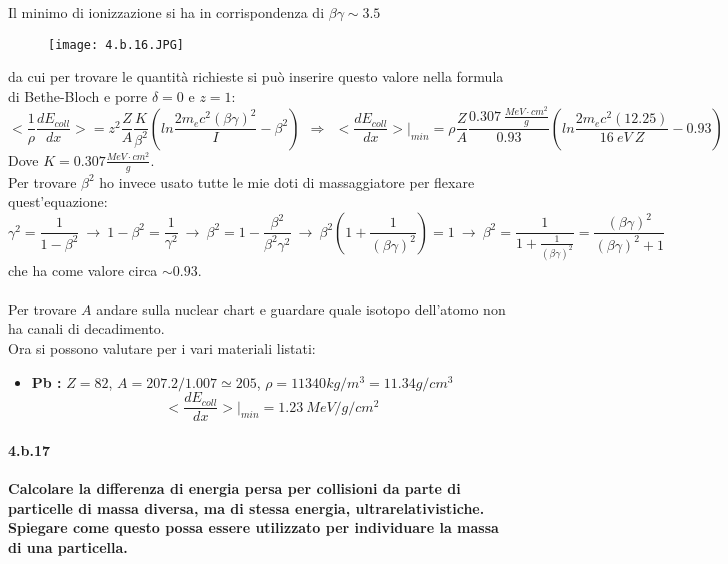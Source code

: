 \documentclass[twoside]{article}
\begin{document}
Il minimo di ionizzazione si ha in corrispondenza di $\beta \gamma \sim 3.5$

\begin{figure}[H]
    \centering
    \texttt{[image: 4.b.16.JPG]}
\end{figure}

da cui per trovare le quantità richieste si può inserire questo valore nella formula di Bethe-Bloch e porre $\delta=0$ e $z=1$:
\begin{equation*}
    <\frac{1}{\rho}\frac{dE_{coll}}{dx}>=z^2\frac{Z}{A}\frac{K}{\beta^2}\left( ln\frac{2m_ec^2(\beta\gamma)^2}{I}-\beta^2 \right) \ \ \Rightarrow \ \ <\frac{dE_{coll}}{dx}>\biggl|_{min}=\rho\frac{Z}{A}\frac{0.307 \ \frac{MeV \cdot cm^2}{g}}{0.93}\left(ln\frac{2m_ec^2(12.25)}{16 \ eV \ Z} -0.93\right)
\end{equation*}
Dove $K=0.307 \frac{MeV\cdot cm^2}{g}$.
\\
Per trovare $\beta^2$ ho invece usato tutte le mie doti di massaggiatore per flexare quest'equazione:
\begin{equation}
    \gamma^2=\frac{1}{1-\beta^2} \ \to \ 1-\beta^2=\frac{1}{\gamma^2} \ \to \ \beta^2=1-\frac{\beta^2}{\beta^2 \gamma^2} \ \to \ \beta^2 \left(1+\frac{1}{(\beta \gamma)^2} \right)=1 \ \to \ \beta^2=\frac{1}{1+\frac{1}{(\beta \gamma)^2}}=\frac{(\beta \gamma)^2}{(\beta \gamma)^2+1}
\end{equation}
che ha come valore circa $\sim 0.93 $.
\\
\\ 
Per trovare $A$ andare sulla nuclear chart e guardare quale isotopo dell'atomo non ha canali di decadimento.
\\
Ora si possono valutare per i vari materiali listati:
\begin{itemize}
    \item \textbf{Pb :} $Z=82$, $A=207.2/1.007\simeq 205$, $\rho=11340 kg/m^3= 11.34 g/cm^3$
    \begin{equation}
        <\frac{dE_{coll}}{dx}>\biggl|_{min}=1.23 \ MeV/g/cm^2
    \end{equation}
\end{itemize}

\paragraph{4.b.17}\textbf{Calcolare la differenza di energia persa per collisioni da parte di particelle di
massa diversa, ma di stessa energia, ultrarelativistiche. Spiegare come questo
possa essere utilizzato per individuare la massa di una particella.} \\ \\
\end{document}
